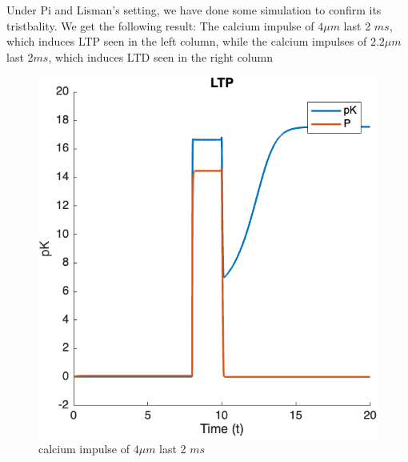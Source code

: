 \documentclass{article}
\begin{document}
Under Pi and Lisman's setting, we have done some simulation to confirm its tristbality. We get the following result: The calcium impulse of $4\mu m$ last 2 $ms$, which induces LTP seen in the left column, while the calcium impulses of $2.2 \mu m$ last 2$ms$, which induces LTD seen in the right column
\begin{figure}[h]
    \centering
    \begin{minipage}[b]{0.45\textwidth}
        \includegraphics[width=\textwidth]{fig1.png}
        \caption{calcium impulse of $4\mu m$ last 2 $ms$}
        \label{fig:image1}
    \end{minipage}
    \hfill %
    \begin{minipage}[b]{0.45\textwidth}

\end{minipage}
\end{figure}
\end{document}

